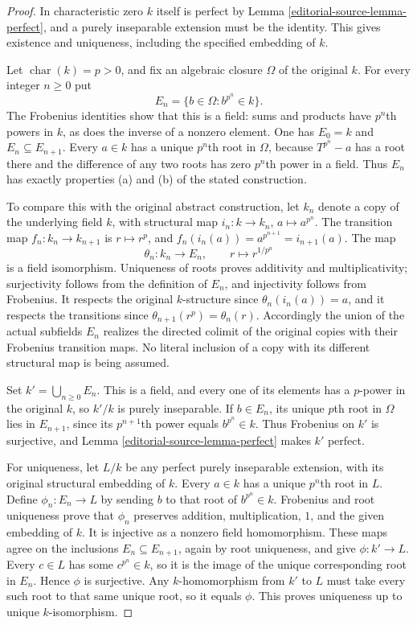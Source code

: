 \begin{proof}
In characteristic zero $k$ itself is perfect by
Lemma \ref{editorial-source-lemma-perfect}, and a purely inseparable
extension must be the identity. This gives
existence and uniqueness, including the specified
embedding of $k$.

Let $\operatorname{char}(k)=p>0$, and fix an
algebraic closure $\Omega$ of the original $k$.
For every integer $n\geq0$ put
$$
E_n=\{b\in\Omega:b^{p^n}\in k\}.
$$
The Frobenius identities show that this is a
field: sums and products have $p^n$th powers
in $k$, as does the inverse of a nonzero
element. One has $E_0=k$ and $E_n\subseteq E_{n+1}$.
Every $a\in k$ has a unique $p^n$th root in
$\Omega$, because $T^{p^n}-a$ has a root there
and the difference of any two roots has zero
$p^n$th power in a field. Thus $E_n$ has exactly
properties (a) and (b) of the stated construction.

To compare this with the original abstract
construction, let $k_n$ denote a copy of the
underlying field $k$, with structural map
$i_n:k\to k_n$, $a\mapsto a^{p^n}$.
The transition map $f_n:k_n\to k_{n+1}$ is
$r\mapsto r^p$, and
$f_n(i_n(a))=a^{p^{n+1}}=i_{n+1}(a)$.
The map
$$
\theta_n:k_n\longrightarrow E_n,\qquad
r\longmapsto r^{1/p^n}
$$
is a field isomorphism. Uniqueness of roots
proves additivity and multiplicativity;
surjectivity follows from the definition of
$E_n$, and injectivity follows from Frobenius.
It respects the original $k$-structure since
$\theta_n(i_n(a))=a$, and it respects the
transitions since
$\theta_{n+1}(r^p)=\theta_n(r)$.
Accordingly the union of the actual subfields
$E_n$ realizes the directed colimit of the
original copies with their Frobenius transition
maps. No literal inclusion of a copy with its
different structural map is being assumed.

Set $k'=\bigcup_{n\geq0}E_n$. This is a field,
and every one of its elements has a $p$-power
in the original $k$, so $k'/k$ is purely
inseparable. If $b\in E_n$, its unique $p$th
root in $\Omega$ lies in $E_{n+1}$, since its
$p^{n+1}$th power equals $b^{p^n}\in k$.
Thus Frobenius on $k'$ is surjective, and
Lemma \ref{editorial-source-lemma-perfect} makes $k'$ perfect.

For uniqueness, let $L/k$ be any perfect purely
inseparable extension, with its original
structural embedding of $k$. Every $a\in k$
has a unique $p^n$th root in $L$. Define
$\phi_n:E_n\to L$ by sending $b$ to that
root of $b^{p^n}\in k$. Frobenius and root
uniqueness prove that $\phi_n$ preserves
addition, multiplication, $1$, and the given
embedding of $k$. It is injective as a
nonzero field homomorphism. These maps agree
on the inclusions $E_n\subseteq E_{n+1}$,
again by root uniqueness, and give
$\phi:k'\to L$. Every $c\in L$ has some
$c^{p^n}\in k$, so it is the image of the
unique corresponding root in $E_n$.
Hence $\phi$ is surjective. Any $k$-homomorphism
from $k'$ to $L$ must take every such root
to that same unique root, so it equals $\phi$.
This proves uniqueness up to unique
$k$-isomorphism.


\end{proof}
